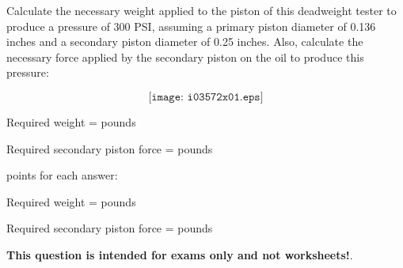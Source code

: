 

Calculate the necessary weight applied to the piston of this deadweight tester to produce a pressure of 300 PSI, assuming a primary piston diameter of 0.136 inches and a secondary piston diameter of 0.25 inches.  Also, calculate the necessary force applied by the secondary piston on the oil to produce this pressure:

\vskip 10pt

$$\texttt{[image: i03572x01.eps]}$$

\vskip 10pt

Required weight = \underbar{\hskip 50pt} pounds

\vskip 10pt

Required secondary piston force = \underbar{\hskip 50pt} pounds 







 points for each answer:

\vskip 10pt

Required weight =  pounds

\vskip 10pt

Required secondary piston force =  pounds 







{\bf This question is intended for exams only and not worksheets!}.



